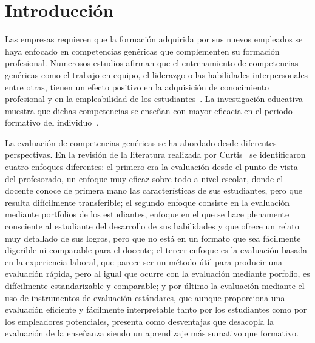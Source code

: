 




\chapter{Introducción}
\label{cha:Introduction}

\ifpdf
    \graphicspath{{1_introduction/figures/PNG/}{1_introduction/figures/PDF/}{1_introduction/figures/}}
\else
    \graphicspath{{1_introduction/figures/EPS/}{1_introduction/figures/}}
\fi



Las empresas requieren que la formación adquirida por sus nuevos empleados se haya enfocado en competencias genéricas que complementen su formación profesional. Numerosos estudios afirman que el entrenamiento de competencias genéricas como el trabajo en equipo, el liderazgo o las habilidades interpersonales entre otras, tienen un efecto positivo en la adquisición de conocimiento profesional y en la empleabilidad de los estudiantes~\cite{ellis2005evaluation,mason2009employability}. La investigación educativa muestra que dichas competencias se enseñan con mayor eficacia en el periodo formativo del individuo~\cite{de2000quality}.

La evaluación de competencias genéricas se ha abordado desde diferentes perspectivas. En la revisión de la literatura realizada por Curtis~\cite{curtis2004assessment} se identificaron cuatro enfoques diferentes: el primero era la evaluación desde el punto de vista del profesorado, un enfoque muy eficaz sobre todo a nivel escolar, donde el docente conoce de primera mano las características de sus estudiantes, pero que resulta difícilmente transferible; el segundo enfoque consiste en la evaluación mediante portfolios de los estudiantes, enfoque en el que se hace plenamente consciente al estudiante del desarrollo de sus habilidades y que ofrece un relato muy detallado de sus logros, pero que no está en un formato que sea fácilmente digerible ni comparable para el docente; el tercer enfoque es la evaluación basada en la experiencia laboral, que parece ser un método útil para producir una evaluación rápida, pero al igual que ocurre con la evaluación mediante porfolio, es difícilmente estandarizable y comparable; y por último la evaluación mediante el uso de instrumentos de evaluación estándares, que aunque proporciona una evaluación eficiente y fácilmente interpretable tanto por los estudiantes como por los empleadores potenciales, presenta como desventajas que desacopla la evaluación de la enseñanza siendo un aprendizaje más sumativo que formativo.

